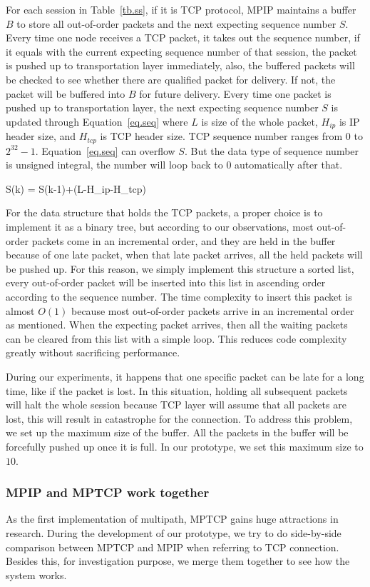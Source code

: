 For each session in Table~\ref{tb.ss}, if it is TCP protocol, MPIP maintains a buffer $B$ to store all out-of-order packets and the next expecting sequence number $S$. Every time one node receives a TCP packet, it takes out the sequence number, if it equals with the current expecting sequence number of that session, the packet is pushed up to transportation layer immediately, also, the buffered packets will be checked to see whether there are qualified packet for delivery. If not, the packet will be buffered into $B$ for future delivery. Every time one packet is pushed up to transportation layer, the next expecting sequence number $S$ is updated through Equation~\ref{eq.seq} where $L$ is size of the whole packet, $H_{ip}$ is IP header size, and $H_{tcp}$ is TCP header size. TCP sequence number ranges from $0$ to $2^{32}-1$. Equation~\ref{eq.seq} can overflow $S$. But the data type of sequence number is unsigned integral, the number will loop back to $0$ automatically after that.

\be
\label{eq.seq}
S(k) = S(k-1)+(L-H_{ip}-H_{tcp})
\ee

For the data structure that holds the TCP packets, a proper choice is to implement it as a binary tree, but according to our observations, most out-of-order packets come in an incremental order, and they are held in the buffer because of one late packet, when that late packet arrives, all the held packets will be pushed up. For this reason, we simply implement this structure a sorted list, every out-of-order packet will be inserted into this list in ascending order according to the sequence number. The time complexity to insert this packet is almost $O(1)$ because most out-of-order packets arrive in an incremental order as mentioned.
When the expecting packet arrives, then all the waiting packets can be cleared from this list with a simple loop. This reduces code complexity greatly without sacrificing performance.

During our experiments, it happens that one specific packet can be late for a long time, like if the packet is lost. In this situation, holding all subsequent packets will halt the whole session because TCP layer will assume that all packets are lost, this will result in catastrophe for the connection. To address this problem, we set up the maximum size of the buffer. All the packets in the buffer will be forcefully pushed up once it is full. In our prototype, we set this maximum size to $10$.

\subsubsection{MPIP and MPTCP work together}
\label{sec:together}
As the first implementation of multipath, MPTCP gains huge attractions in research. During the development of our prototype, we try to do side-by-side comparison between MPTCP and MPIP when referring to TCP connection. Besides this, for investigation purpose, we merge them together to see how the system works.

